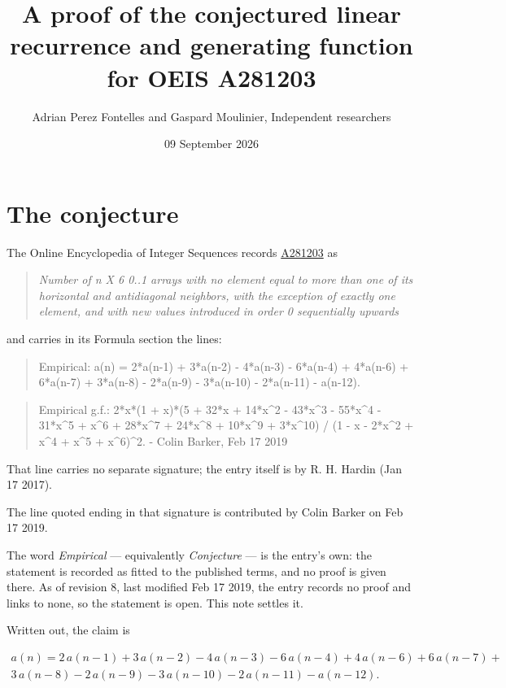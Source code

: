 \documentclass[11pt]{article}
\title{A proof of the conjectured linear recurrence and generating function for OEIS A281203}
\author{Adrian Perez Fontelles and Gaspard Moulinier, Independent researchers}
\date{09 September 2026}
\theoremstyle{definition}
\begin{document}
\maketitle
\section{The conjecture}

The Online Encyclopedia of Integer Sequences records \href{https://oeis.org/A281203}{A281203} as

\begin{quote}\itshape Number of n X 6 0..1 arrays with no element equal to more than one of its horizontal and antidiagonal neighbors, with the exception of exactly one element, and with new values introduced in order 0 sequentially upwards\end{quote}

and carries in its Formula section the lines:

\begin{quote}\ttfamily Empirical: a(n) = 2*a(n-1) + 3*a(n-2) - 4*a(n-3) - 6*a(n-4) + 4*a(n-6) + 6*a(n-7) + 3*a(n-8) - 2*a(n-9) - 3*a(n-10) - 2*a(n-11) - a(n-12).\end{quote}

\begin{quote}\ttfamily Empirical g.f.: 2*x*(1 + x)*(5 + 32*x + 14*x\textasciicircum{}2 - 43*x\textasciicircum{}3 - 55*x\textasciicircum{}4 - 31*x\textasciicircum{}5 + x\textasciicircum{}6 + 28*x\textasciicircum{}7 + 24*x\textasciicircum{}8 + 10*x\textasciicircum{}9 + 3*x\textasciicircum{}10) / (1 - x - 2*x\textasciicircum{}2 + x\textasciicircum{}4 + x\textasciicircum{}5 + x\textasciicircum{}6)\textasciicircum{}2. - Colin Barker, Feb 17 2019\end{quote}

That line carries no separate signature; the entry itself is by R. H. Hardin (Jan 17 2017).

The line quoted ending in that signature is contributed by Colin Barker on Feb 17 2019.

The word {\itshape Empirical} --- equivalently {\itshape Conjecture} --- is the entry's own: the statement is recorded as fitted to the published terms, and no proof is given there. As of revision 8, last modified Feb 17 2019, the entry records no proof and links to none, so the statement is open. This note settles it.

Written out, the claim is

\begin{multline*} a(n) = 2\,a(n-1) + 3\,a(n-2) - 4\,a(n-3) - 6\,a(n-4) + 4\,a(n-6) + 6\,a(n-7) + \\ 3\,a(n-8) - 2\,a(n-9) - 3\,a(n-10) - 2\,a(n-11) - a(n-12). \end{multline*}
\end{document}
